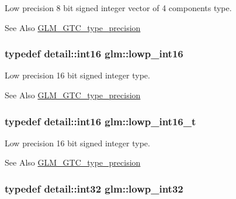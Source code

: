 Low precision 8 bit signed integer vector of 4 components type. \begin{DoxySeeAlso}{See Also}
\hyperlink{group__gtc__type__precision}{G\-L\-M\-\_\-\-G\-T\-C\-\_\-type\-\_\-precision} 
\end{DoxySeeAlso}
\hypertarget{group__gtc__type__precision_ga71fc0c399fa4780507748b643733f153}{
\subsubsection[{lowp\-\_\-int16}]{\setlength{\rightskip}{0pt plus 5cm}typedef detail\-::int16 {\bf glm\-::lowp\-\_\-int16}}}\label{group__gtc__type__precision_ga71fc0c399fa4780507748b643733f153}
Low precision 16 bit signed integer type. \begin{DoxySeeAlso}{See Also}
\hyperlink{group__gtc__type__precision}{G\-L\-M\-\_\-\-G\-T\-C\-\_\-type\-\_\-precision} 
\end{DoxySeeAlso}
\hypertarget{group__gtc__type__precision_gae34c3d53c4c1434fc9f26538b0185667}{
\subsubsection[{lowp\-\_\-int16\-\_\-t}]{\setlength{\rightskip}{0pt plus 5cm}typedef detail\-::int16 {\bf glm\-::lowp\-\_\-int16\-\_\-t}}}\label{group__gtc__type__precision_gae34c3d53c4c1434fc9f26538b0185667}
Low precision 16 bit signed integer type. \begin{DoxySeeAlso}{See Also}
\hyperlink{group__gtc__type__precision}{G\-L\-M\-\_\-\-G\-T\-C\-\_\-type\-\_\-precision} 
\end{DoxySeeAlso}
\hypertarget{group__gtc__type__precision_gad9939c9d6fec1c6accc02a83c6500f08}{
\subsubsection[{lowp\-\_\-int32}]{\setlength{\rightskip}{0pt plus 5cm}typedef detail\-::int32 {\bf glm\-::lowp\-\_\-int32}}}\label{group__gtc__type__precision_gad9939c9d6fec1c6accc02a83c6500f08}

